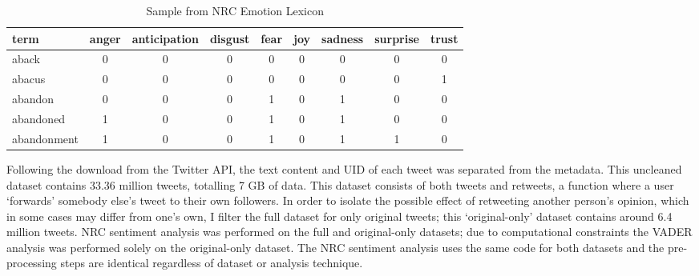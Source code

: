 \documentclass[12pt,a4]{article}
\begin{document}
\begin{singlespace}
  \begin{table}[!htb]\centering \caption{Sample from NRC Emotion Lexicon \parencite{mohammadCrowdsourcingWordEmotion2013}}
    \begin{tabular}{@{}lcccccccc@{}}
    \toprule
    term        & anger & anticipation & disgust & fear & joy & sadness & surprise & trust \\ \midrule
    aback       & 0     & 0            & 0       & 0    & 0   & 0       & 0        & 0     \\
    abacus      & 0     & 0            & 0       & 0    & 0   & 0       & 0        & 1     \\
    abandon     & 0     & 0            & 0       & 1    & 0   & 1       & 0        & 0     \\
    abandoned   & 1     & 0            & 0       & 1    & 0   & 1       & 0        & 0     \\
    abandonment & 1     & 0            & 0       & 1    & 0   & 1       & 1        & 0     \\ \bottomrule
    \end{tabular}
    \end{table}
\end{singlespace}

Following the download from the Twitter API, the text content and UID of each tweet was separated from the metadata. This uncleaned dataset contains 33.36 million tweets, totalling 7 GB of data. This dataset consists of both tweets and retweets, a function where a user `forwards' somebody else's tweet to their own followers. In order to isolate the possible effect of retweeting another person's opinion, which in some cases may differ from one's own, I filter the full dataset for only original tweets; this `original-only' dataset contains around 6.4 million tweets. NRC sentiment analysis was performed on the full and original-only datasets; due to computational constraints the VADER analysis was performed solely on the original-only dataset. The NRC sentiment analysis uses the same code for both datasets and the pre-processing steps are identical regardless of dataset or analysis technique.
\end{document}
